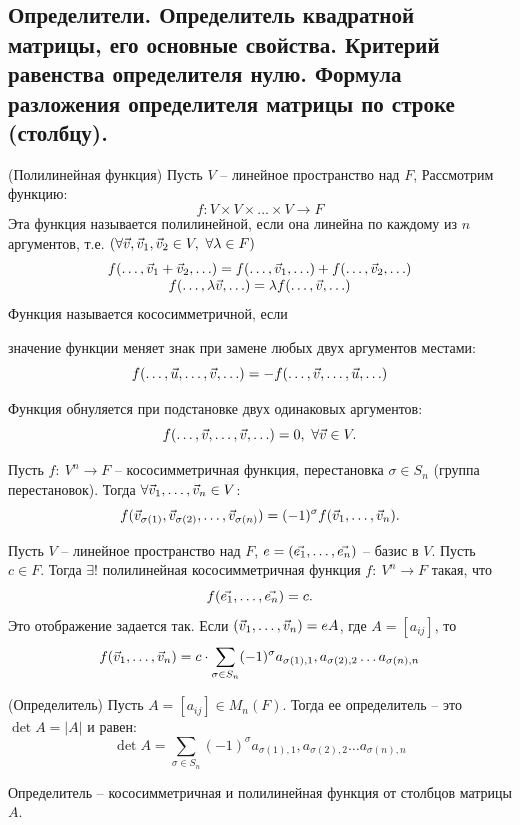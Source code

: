 \begin{multicols}{2}
\section{Определители. Определитель квадратной матрицы, его основные свойства. Критерий
равенства определителя нулю. Формула разложения определителя матрицы по строке
(столбцу).}
\begin{definition}{(Полилинейная функция)}{}
    Пусть $V$ -- линейное пространство над $F$, Рассмотрим функцию:
    \[
        f: V\times V\times \ldots \times V \to F
        \]
    Эта функция называется полилинейной, если она линейна по каждому из $n$ аргументов, т.е. $(\forall \vec{v}, \vec{v}_1, \vec{v}_2 \in V, \ \forall \lambda \in F)$
    \[
        \begin{array}{c}
            f(\ldots, \vec{v}_1 + \vec{v}_2, \ldots) = f(\ldots, \vec{v}_1, \ldots) + f(\ldots, \vec{v}_2, \ldots)\\
            f(\ldots, \lambda \vec{v}, \ldots) = \lambda f(\ldots, \vec{v}, \ldots)
        \end{array}
        \]
    Функция называется кососимметричной, если 
    \begin{enumerate*}
        \item значение функции меняет знак при замене любых двух аргументов местами:
        \[
            f(\ldots, \vec{u}, \ldots, \vec{v}, \ldots) = -f(\ldots, \vec{v}, \ldots, \vec{u}, \ldots)
            \]
        \item Функция обнуляется при подстановке двух одинаковых аргументов:
        \[
            f(\ldots, \vv, \ldots, \vv, \ldots) = 0, \ \forall \vv \in V.  
        \]
    \end{enumerate*}
\end{definition}
\begin{proposition}{}{}
    Пусть $f: \ V^n \to F$ -- кососимметричная функция, перестановка $\sigma \in S_n$ (группа перестановок). Тогда $\forall \vec{v}_1, \ldots, \vec{v}_n \in V$:
    \[
        f(\vec{v}_{\sigma(1)}, \vec{v}_{\sigma(2)}, \ldots, \vec{v}_{\sigma(n)}) = (-1)^{\sigma} f(\vec{v}_1, \ldots, \vec{v}_n).
        \]
\end{proposition}
\begin{theorema}{}{}
    Пусть $V$ -- линейное пространство над $F$, $e = (\vec{e_1}, \ldots, \vec{e_n})$ -- базис в $V$. Пусть $c\in F$. Тогда $\exists !$ полилинейная кососимметричная функция $f: \ V^n \to F$ такая, что 
    \[
        f(\vec{e_1}, \ldots, \vec{e_n}) = c.
        \]
    Это отображение задается так. Если $(\vec{v}_1, \ldots, \vec{v}_n) = eA$, где $A = [a_{ij}]$, то
    \[
        f(\vec{v}_1, \ldots, \vec{v}_n) = c\cdot \sum\limits_{\sigma \in S_n} (-1)^\sigma a_{\sigma(1), 1}, a_{\sigma(2), 2}\ldots a_{\sigma(n), n}
    \]
\end{theorema}
\begin{definition}{(Определитель)}{}
    Пусть $A = [a_{ij}]\in M_n(F)$. Тогда ее определитель -- это $\det A = |A|$ и равен:
    \[
        \det A = \sum\limits_{\sigma \in S_n} (-1)^\sigma a_{\sigma(1), 1}, a_{\sigma(2), 2}\ldots a_{\sigma(n), n}
    \]
\end{definition}
Определитель -- кососимметричная и полилинейная функция от столбцов матрицы $A$.

\end{multicols}
